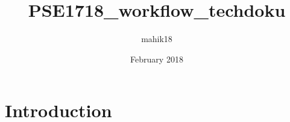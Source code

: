 \documentclass{article}
\title{PSE1718_workflow_techdoku}
\author{mahik18 }
\date{February 2018}
\begin{document}
\maketitle

\section{Introduction}
\end{document}
